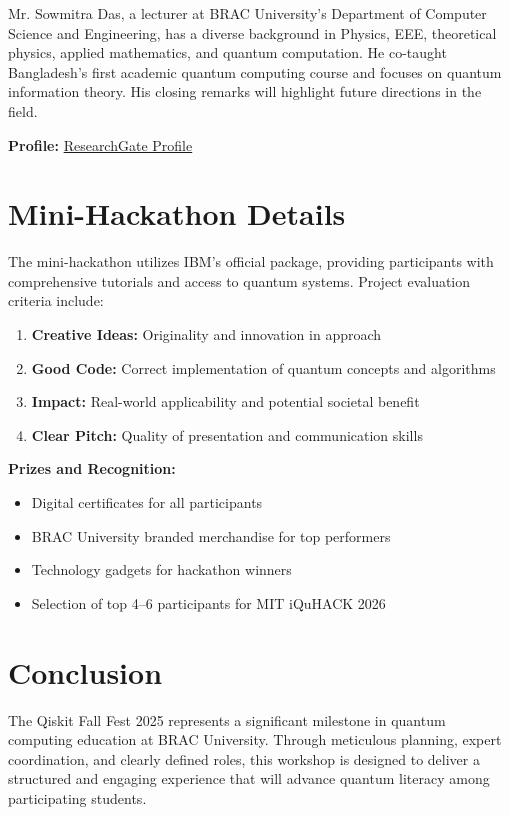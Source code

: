 \documentclass[11pt,a4paper]{article}
\begin{document}
\noindent Mr. Sowmitra Das, a lecturer at BRAC University's Department of Computer Science and Engineering, has a diverse background in Physics, EEE, theoretical physics, applied mathematics, and quantum computation. He co-taught Bangladesh's first academic quantum computing course and focuses on quantum information theory. His closing remarks will highlight future directions in the field.

\textbf{Profile:} \href{https://www.researchgate.net/profile/Sowmitra-Das}{ResearchGate Profile}

\section{Mini-Hackathon Details}

The mini-hackathon utilizes IBM's official package, providing participants with comprehensive tutorials and access to quantum systems. Project evaluation criteria include:

\begin{enumerate}[leftmargin=*]
    \item \textbf{Creative Ideas:} Originality and innovation in approach
    \item \textbf{Good Code:} Correct implementation of quantum concepts and algorithms
    \item \textbf{Impact:} Real-world applicability and potential societal benefit
    \item \textbf{Clear Pitch:} Quality of presentation and communication skills
\end{enumerate}

\textbf{Prizes and Recognition:}
\begin{itemize}[leftmargin=*]
    \item Digital certificates for all participants
    \item BRAC University branded merchandise for top performers
    \item Technology gadgets for hackathon winners
    \item Selection of top 4--6 participants for MIT iQuHACK 2026
\end{itemize}

\section{Conclusion}

The Qiskit Fall Fest 2025 represents a significant milestone in quantum computing education at BRAC University. Through meticulous planning, expert coordination, and clearly defined roles, this workshop is designed to deliver a structured and engaging experience that will advance quantum literacy among participating students.
\end{document}
